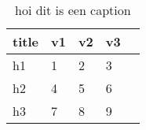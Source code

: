 \begin{table}[H]
\centering
\caption{hoi dit is een caption}
\label{tab:label}
\begin{tabular}{|l|llll|}\hline
    title & v1 & v2 & v3 \\
    \hline 
    h1 & 1 & 2 & 3 \\
    h2 & 4 & 5 & 6 \\
    h3 & 7 & 8 & 9 \\
    \hline 
\end{tabular}
\end{table}
